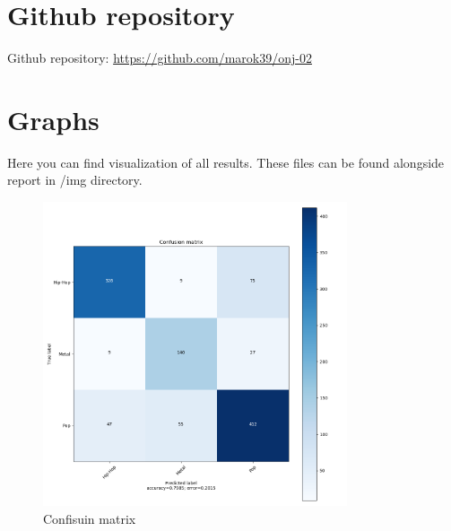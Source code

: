 \documentclass[a4paper,11pt]{article}
\begin{document}

\pagebreak
\section{Github repository}
Github repository: \href{https://github.com/marok39/onj-02}{https://github.com/marok39/onj-02}


\appendix
\appendixpage
\section{\label{label-graphs} Graphs}

Here you can find visualization of all results. These files can be found alongside report in /img directory.

\begin{figure}[h]
\begin{center}
\includegraphics[width=0.8\textwidth]{./img/matrix.png}
\end{center}
\caption{Confisuin matrix}
\label{report}
\end{figure}
\end{document}
